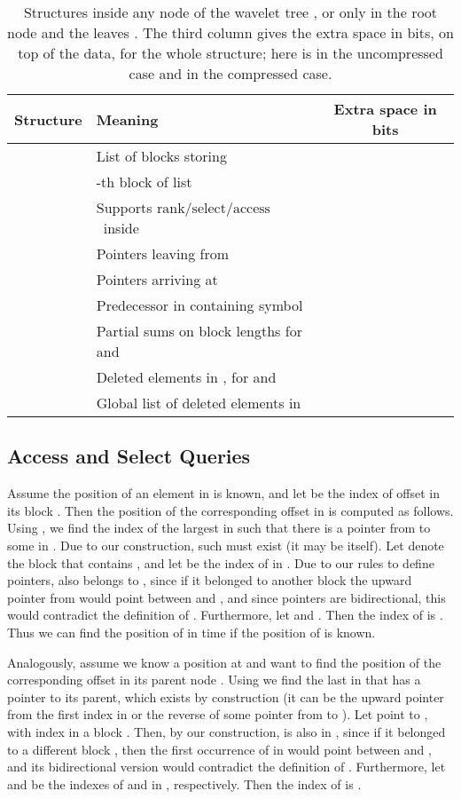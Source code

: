\documentclass[11pt]{article}
\def\idrm#1{\ensuremath{\mathrm{#1}}}
\newcommand{\ra}{\idrm{rank}}
\newcommand{\sel}{\idrm{select}}
\newcommand{\acc}{\idrm{access}}
\begin{document}
\begin{table}
\caption{Structures inside any node  of the wavelet tree , 
or only in the root node  and the leaves . The third column gives
the extra space in bits, on top of the data, for the whole structure; here
 is  in the uncompressed case and  in the
compressed case.}
\label{tab:not}
\begin{center}
\begin{tabular}{l|l|c}
Structure & Meaning & Extra space in bits \\
\hline
 & List of blocks storing  &  \\
 & -th block of list  &  \\
 & Supports \ra/\sel/\acc\ inside  &  \\
 & Pointers leaving from  & \\
 & Pointers arriving at  &  \\
 & Predecessor in  containing symbol  &  \\
 & Partial sums on block lengths for  and  &  \\
 & Deleted elements in , for  and  &  \\
    & Global list of deleted elements in  &  \\
\end{tabular}
\end{center}
\end{table}


\subsection{Access and Select Queries}

Assume the position of an element  in  is known, 
and let  be the index of offset  in its block . 
Then the position of the corresponding offset  in  is computed as follows.
Using , we find the index  of the largest  in  
such that
there is a pointer from  to some  in . Due to our
construction, such  must exist (it may be  itself). 
Let  denote the block that contains , and let
 be the index of  in .
Due to our rules to define pointers,  also 
belongs to , since if it belonged to another block  
the upward pointer from  would point between  and ,
and since pointers are bidirectional, this would contradict the definition of
. 
 Furthermore, let  and . 
Then the index of  is . 
Thus we can find the position of  in 
 time if the position of  is known. 

Analogously, assume we know a position  at  and want to 
find the position of the corresponding offset  in its parent node . Using  
we find the last  in  that has a pointer to its
parent, which exists by construction (it can be the upward pointer from the 
first index in  or the reverse of some pointer from  to ). 
Let  point to , with index  in a block . 
Then, by our construction,  is also in , since if it belonged
to a different block , then the first occurrence of  in 
would point between  and , and its bidirectional version would 
contradict the definition of .
Furthermore, let
 and  be the indexes of  and  in , respectively.
Then the index of  is 
.
\end{document}
